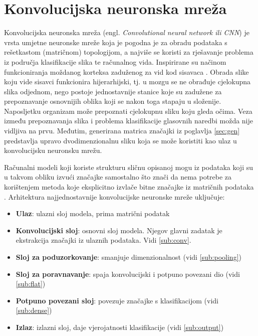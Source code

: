 \section{Konvolucijska neuronska mreža}
\label{sec:cnn}

Konvolucijska neuronska mreža (engl. \textit{Convolutional neural network ili CNN}) je vrsta 
umjetne neuronske mreže koja je pogodna je za obradu podataka s rešetkastom (matričnom)
topologijom, a najviše se koristi za rješavanje problema iz područja klasifikacije slika
te računalnog vida. Inspirirane su načinom funkcioniranja moždanog korteksa 
zaduženog za vid kod sisavaca \cite{pycodemates}. Obrada slike koju vide sisavci
funkcionira hijerarhijski, tj. u mozgu se ne obrađuje cjelokupna slika odjednom,
nego postoje jednostavnije stanice koje su zadužene za prepoznavanje osnovnijih
oblika koji se nakon toga stapaju u složenije. Naposljetku 
organizam može prepoznati cjelokupnu sliku koju gleda očima.
Veza između prepoznavanja slika i problema klasifikacije glasovnih naredbi možda nije
vidljiva na prvu. Međutim, generirana matrica značajki iz poglavlja \ref{sec:gen} predstavlja
upravo dvodimenzionalnu
sliku koja se može koristiti kao ulaz u konvolucijsku neuronsku mrežu.

Računalni modeli koji koriste strukturu sličnu opisanoj mogu iz
podataka koji su u takvom obliku izvući značajke samostalno što znači da nema
potrebe za korištenjem metoda koje eksplicitno izvlače bitne značajke iz matričnih podataka
\cite{1}. Arhitektura najjednostavnije konvolucijske neuronske mreže
uključuje:

\begin{itemize}
    \item \textbf{Ulaz}: ulazni sloj modela, prima matrični podatak
    \item \textbf{Konvolucijski sloj}: osnovni sloj modela. Njegov glavni zadatak
          je ekstrakcija značajki iz ulaznih podataka. Vidi \ref{sub:conv}.
    \item \textbf{Sloj za poduzorkovanje}: smanjuje dimenzionalnost (vidi \ref{sub:pooling})
    \item \textbf{Sloj za poravnavanje}: spaja konvolucijski i potpuno povezani dio (vidi \ref{sub:flat})
    \item \textbf{Potpuno povezani sloj}: povezuje značajke s klasifikacijom (vidi \ref{sub:dense})
    \item \textbf{Izlaz}: izlazni sloj, daje vjerojatnosti klasifikacije (vidi \ref{sub:output})
\end{itemize}

